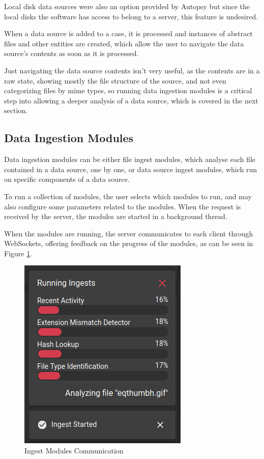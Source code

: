 Local disk data sources were also an option provided by Autopsy but since the local disks the software has access to belong to a server, this feature is undesired.

When a data source is added to a case, it is processed and instances of abstract files and other entities are created, which allow the user to navigate the data source's contents as soon as it is processed.

Just navigating the data source contents isn't very useful, as the contents are in a raw state, showing mostly the file structure of the source, and not even categorizing files by \acrshort{mime} types, so running data
ingestion modules is a critical step into allowing a deeper analysis of a data source, which is covered in the next section.

\subsection{Data Ingestion Modules}

Data ingestion modules can be either file ingest modules, which analyse each file contained in a data source, one by one,
or data source ingest modules, which run on specific components of a data source.

To run a collection of modules, the user selects which modules to run, and may also configure some parameters related to the modules. When the request is received by the server, the modules are started in a background thread.

When the modules are running, the server communicates to each client through WebSockets, offering feedback on the progress of the modules, as can be seen in Figure \ref{fig:modules}.

\begin{figure}[ht]
 \centering
 \includegraphics[width=0.55\linewidth]{imgs/modules.png}
 \caption{Ingest Modules Communication}
 \label{fig:modules}
\end{figure}

